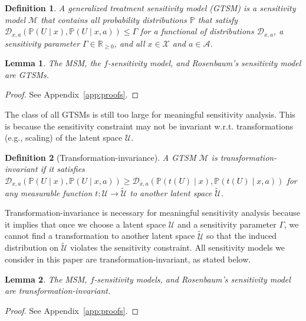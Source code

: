 \documentclass{article} %
\newcommand{\R}{\mathbb{R}}
\theoremstyle{definition}
\newtheorem{definition}{Definition}
\theoremstyle{plain}
\newtheorem{lemma}{Lemma}
\begin{document}
\begin{definition}
\emph{A generalized treatment sensitivity model (GTSM) is a sensitivity model $\mathcal{M}$ that contains all probability distributions $\mathbb{P}$ that satisfy $\mathcal{D}_{x, a}\left(\mathbb{P}(U \mid x), \mathbb{P}(U \mid x, a)\right) \leq \Gamma$ for a functional of distributions $\mathcal{D}_{x, a}$, a sensitivity parameter $\Gamma \in \R_{\geq 0}$, and all $x \in \mathcal{X}$ and $a \in \mathcal{A}$.}
\end{definition}
\begin{lemma}\label{lem:gtsm}
The MSM, the $f$-sensitivity model, and Rosenbaum's sensitivity model are GTSMs.
\end{lemma}
\vspace{-0.45cm}
\begin{proof}
    See Appendix~\ref{app:proofs}.
\end{proof}
The class of all GTSMs is still too large for meaningful sensitivity analysis. This is because the sensitivity constraint may not be invariant w.r.t. transformations (e.g., scaling) of the latent space $\mathcal{U}$.
\begin{definition}[Transformation-invariance]\label{def:transformation}
\emph{A GTSM $\mathcal{M}$ is transformation-invariant if it satisfies $\mathcal{D}_{x, a}(\mathbb{P}(U \mid x), \mathbb{P}(U \mid x, a)) \geq \mathcal{D}_{x, a}(\mathbb{P}(t(U) \mid x), \mathbb{P}(t(U) \mid x, a))$ for any measurable function $t \colon \mathcal{U} \to \widetilde{\mathcal{U}}$ to another latent space $\widetilde{\mathcal{U}}$.}
\end{definition}

Transformation-invariance is necessary for meaningful sensitivity analysis because it implies that once we choose a latent space $\mathcal{U}$ and a sensitivity parameter $\Gamma$, we cannot find a transformation to another latent space $\widetilde{\mathcal{U}}$ so that the induced distribution on $\widetilde{\mathcal{U}}$ violates the sensitivity constraint. 
All sensitivity models we consider in this paper are transformation-invariant, as stated below.

\begin{lemma}\label{lem:transformation}
The MSM, $f$-sensitivity models, and Rosenbaum's sensitivity model are transformation-invariant.
\end{lemma}
\vspace{-0.45cm}
\begin{proof}
    See Appendix~\ref{app:proofs}.
\end{proof}
\end{document}
